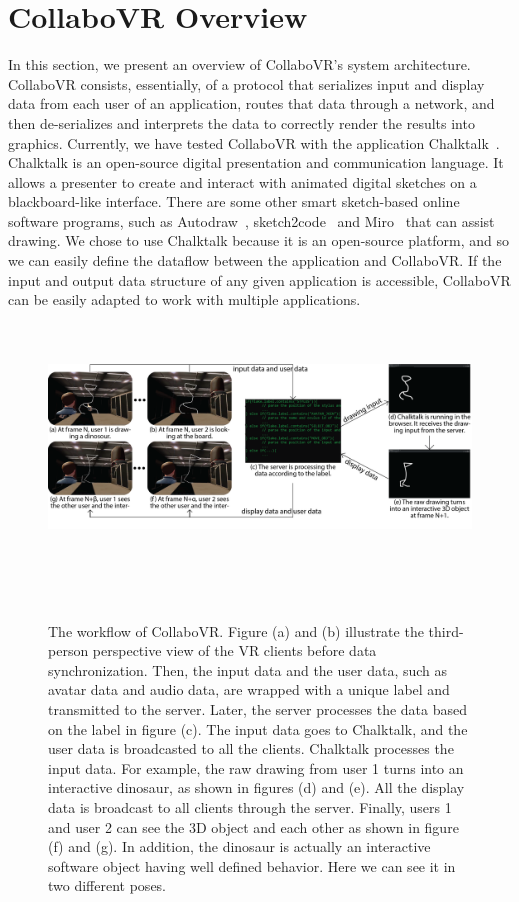 \documentclass{sigchi}
\begin{document}
\section{CollaboVR Overview}
In this section, we present an overview of CollaboVR's system architecture. CollaboVR consists, essentially, of a protocol that serializes input and display data from each user of an application, routes that data through a network, and then de-serializes and interprets the data to correctly render the results into graphics. Currently, we have tested CollaboVR with the application Chalktalk~\cite{perlin2018chalktalk}. Chalktalk is an open-source digital presentation and communication language. It allows a presenter to create and interact with animated digital sketches on a blackboard-like interface. There are some other smart sketch-based online software programs, such as Autodraw~\cite{Autodraw}, sketch2code~\cite{Sketch2code} and Miro~\cite{Miro} that can assist drawing. We chose to use Chalktalk because it is an open-source platform, and so we can easily define the dataflow between the application and CollaboVR. If the input and output data structure of any given application is accessible, CollaboVR can be easily adapted to work with multiple applications.

\begin{figure}[ht!]
 \centering
 \includegraphics[height = 6.5cm]{Figure2.png}
 \caption{The workflow of CollaboVR. Figure (a) and (b) illustrate the third-person perspective view of the VR clients before data synchronization. Then, the input data and the user data, such as avatar data and audio data, are wrapped with a unique label and transmitted to the server. Later, the server processes the data based on the label in figure (c). The input data goes to Chalktalk, and the user data is broadcasted to all the clients. Chalktalk processes the input data. For example, the raw drawing from user 1 turns into an interactive dinosaur, as shown in figures (d) and (e). All the display data is broadcast to all clients through the server. Finally, users 1 and user 2 can see the 3D object and each other as shown in figure (f) and (g). In addition, the dinosaur is actually an interactive software object having well defined behavior. Here we can see it in two different poses.}
 ~\label{fig:workflow}
\end{figure}
\end{document}

